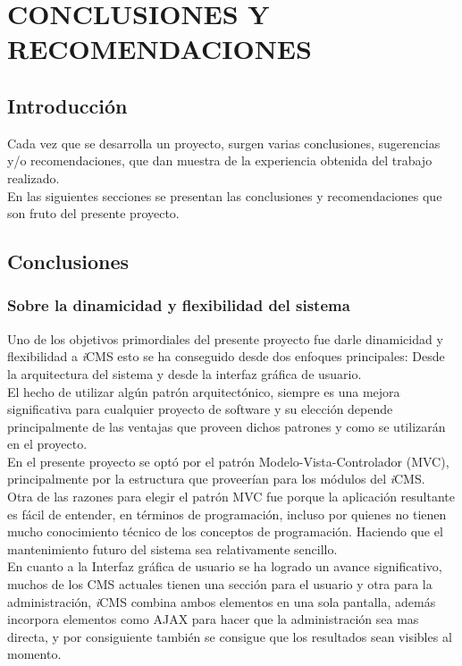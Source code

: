 \chapter{CONCLUSIONES Y RECOMENDACIONES}
\newpage

\section{Introducci\'on}
Cada vez que se desarrolla un proyecto, surgen varias conclusiones, sugerencias y/o recomendaciones, que dan muestra de la experiencia obtenida del trabajo realizado.\\
En las siguientes secciones se presentan las conclusiones y recomendaciones que son fruto del presente proyecto.

\section{Conclusiones}

\subsection{Sobre la dinamicidad y flexibilidad del sistema}
Uno de los objetivos primordiales del presente proyecto fue darle dinamicidad y flexibilidad a \textit{i}CMS esto se ha conseguido desde dos enfoques principales: Desde la arquitectura del sistema y desde la interfaz gr\'afica de usuario.\\

El hecho de utilizar alg\'un patr\'on arquitect\'onico, siempre es una mejora significativa para cualquier proyecto de software y su elecci\'on depende principalmente de las ventajas que proveen dichos patrones y como se utilizar\'an en el proyecto.\\
En el presente proyecto se opt\'o por el patr\'on Modelo-Vista-Controlador (MVC), principalmente por la estructura que proveer\'ian para los m\'odulos del \textit{i}CMS.\\
Otra de las razones para elegir el patr\'on MVC fue porque la aplicaci\'on resultante es f\'acil de entender, en t\'erminos de programaci\'on, incluso por quienes no tienen mucho conocimiento t\'ecnico de los conceptos de programaci\'on. Haciendo que el mantenimiento futuro del sistema sea relativamente sencillo.\\

En cuanto a la Interfaz gr\'afica de usuario se ha logrado un avance significativo, muchos de los CMS actuales tienen una secci\'on para el usuario y otra para la administraci\'on, \textit{i}CMS combina ambos elementos en una sola pantalla, adem\'as incorpora elementos como AJAX para hacer que la administraci\'on sea mas directa, y por consiguiente tambi\'en se consigue que los resultados sean visibles al momento.


